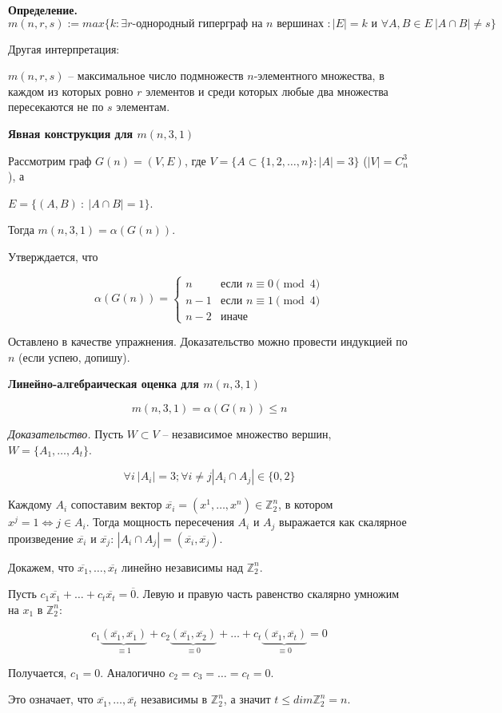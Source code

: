 \textbf{Определение.}
$$
m(n, r, s) := max \{ k : \exists r \text{-однородный гиперграф на } n \text{ вершинах } :
|E| = k \text{ и } \forall A, B \in E \ |A \cap B| \neq s \}
$$

Другая интерпретация:

$m(n, r, s)$ -- максимальное число подмножеств $n$-элементного множества, в каждом из
которых ровно $r$ элементов и среди которых любые два множества пересекаются не по $s$
элементам.

\textbf{Явная конструкция для $m(n, 3, 1)$}

Рассмотрим граф $G(n) = (V, E)$, где 
$V = \{ A \subset \{1, 2, \ldots, n\} : |A| = 3\}$ ($|V| = C_n^3$), а

$E = \{ (A, B)\ :\ |A \cap B| = 1\}$.

Тогда $m(n, 3, 1) = \alpha(G(n))$.

Утверждается, что

\begin{equation*}
\alpha(G(n)) = 
\begin{cases}
n & \text{если } n \equiv 0 \pmod 4\\
n - 1 & \text{если } n \equiv 1 \pmod 4\\
n - 2 & \text{иначе}
\end{cases}
\end{equation*}

Оставлено в качестве упражнения. 
Доказательство можно провести индукцией по $n$ (если успею, допишу).

\textbf{Линейно-алгебраическая оценка для $m(n, 3, 1)$}

$$
m(n, 3, 1) = \alpha(G(n)) \leq n
$$

\textit{Доказательство.}
Пусть $W \subset V$ -- независимое множество вершин,
$W = \{ A_1, \ldots, A_t \}$.

$$
\forall i\ |A_i| = 3; \forall i \neq j |A_i \cap A_j| \in \{0, 2\}
$$

Каждому $A_i$ сопоставим вектор $\overline{x_i} = (x^1, \ldots, x^n) \in \mathbb{Z}_2^n$,
в котором $x^j = 1 \Leftrightarrow j \in A_i$.
Тогда мощность пересечения $A_i$ и $A_j$ выражается как скалярное произведение $\overline{x_i}$ и $\overline{x_j}$:
$|A_i \cap A_j| = (\overline{x_i}, \overline{x_j})$.

Докажем, что $\overline{x_1}, \ldots, \overline{x_t}$ 
линейно независимы над $\mathbb{Z}_2^n$.

Пусть $c_1 \overline{x_1} + \ldots + c_t \overline{x_t} = \overline{0}$. Левую и правую часть равенство скалярно умножим на $x_1$ в $\mathbb{Z}_2^n$:

$$
    c_1 \underbrace{(\overline{x_1}, \overline{x_1})}_{\equiv 1} + 
    c_2 \underbrace{(\overline{x_1}, \overline{x_2})}_{\equiv 0} + \ldots +
    c_t \underbrace{(\overline{x_1}, \overline{x_t})}_{\equiv 0} = 0
$$

Получается, $c_1 = 0$. Аналогично $c_2 = c_3 = \ldots = c_t = 0$.

Это означает, что $\overline{x_1}, \ldots, \overline{x_t}$ независимы в $\mathbb{Z}_2^n$, а значит $t \leqslant dim \mathbb{Z}_2^n = n$.